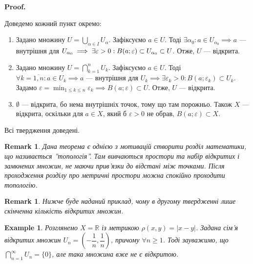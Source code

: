 \documentclass[a4paper, 10pt]{article}
\makeatletter
\theoremstyle{theoremdd}
\theoremstyle{theoremdd}
\theoremstyle{theoremdd}
\theoremstyle{theoremdd}
\newtheorem{example}[theorem]{Example}
\theoremstyle{theoremdd}
\theoremstyle{theoremdd}
\newtheorem{remark}[theorem]{Remark}
\theoremstyle{theoremdd}
\theoremstyle{theoremdd}
\renewenvironment{proof}[1][Proof.\\]{\par
\pushQED{\hfill \qed}%
\normalfont \topsep6\p@\@plus6\p@\relax
\trivlist
\item\relax
{\bfseries
#1\@addpunct{.}}\hspace\labelsep\ignorespaces
}{%
\popQED\endtrivlist\@endpefalse
}
\makeatother
\begin{document}
\begin{proof}
Доведемо кожний пункт окремо:
\begin{enumerate}[wide=0pt,label={\arabic*)}]
\item Задано множину $U = \displaystyle \bigcup_{\alpha \in I} U_{\alpha}$. Зафіксуємо $a \in U$. Тоді $\exists \alpha_0: a \in U_{\alpha_0} \implies a$ --- внутрішня для $U_{\alpha_0} \\ \implies \exists \varepsilon > 0: B(a;\varepsilon) \subset U_{\alpha_0} \subset U$. Отже, $U$ --- відкрита.

\item Задано множину $U = \displaystyle \bigcap_{k=1}^n U_k$. Зафіксуємо $a \in U$. Тоді $\forall k = \overline{1,n}: a \in U_k \implies a$ --- внутрішня для $U_k \implies \exists \varepsilon_k > 0: B(a;\varepsilon_k) \subset U_k$. Задамо $\varepsilon = \displaystyle\min_{1 \leq k \leq n} \varepsilon_k \implies B(a;\varepsilon) \subset U$. Отже, $U$ --- відкрита.

\item $\emptyset$ --- відкрита, бо нема внутрішніх точок, тому що там порожньо. Також $X$ --- відкрита, оскільки для $a \in X$, який б $\varepsilon > 0$ не обрав, $B(a;\varepsilon) \subset X$.
\end{enumerate}
Всі твердження доведені.
\end{proof}

\begin{remark}
Дана теорема є однією з мотивацій створити розділ математики, що називається ''топологія''. Там вивчаються простори та набір відкритих і замкнених множин, не маючи прив'язки до відстані між точками. Після проходження розділу про метричні простори можна спокійно проходити топологію.
\end{remark}

\begin{remark}
Нижче буде наданий приклад, чому в другому твердженні лише скінченна кількість відкритих множин.
\end{remark}

\begin{example}
Розглянемо $X = \mathbb{R}$ із метрикою $\rho(x,y) = |x-y|$. Задана сім'я відкритих множин $U_n = \left( -\dfrac{1}{n}, \dfrac{1}{n} \right)$, причому $\forall n \geq 1$. Тоді зауважимо, що $\displaystyle\bigcap_{n=1}^\infty U_n = \{0\}$, але така множина вже не є відкритою.
\end{example}
\end{document}
